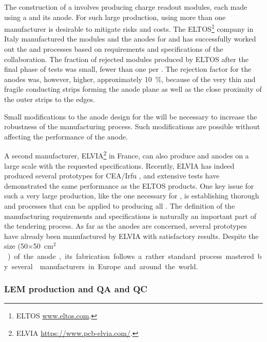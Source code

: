 The construction of a  
 involves producing \dpnumswch charge readout modules, each made using a  and its anode. For such large production, using more than one manufacturer is desirable to mitigate risks and costs. The ELTOS\footnote{ELTOS\texttrademark{} \url{www.eltos.com}.} company in Italy manufactured the  modules and the anodes for   and has successfully worked out the  and  processes based on requirements and specifications of the  collaboration. The fraction of rejected  modules produced by ELTOS after the final phase of tests was small, fewer than one  per . The rejection factor for the anodes was, however, higher, approximately \SI{10}{\%}, because of the very thin and fragile conducting strips forming the anode plane as well as the close proximity of the outer strips to the  edges. 

Small modifications to the anode design for the  will be necessary to increase the robustness of the manufacturing process. Such modifications are possible without  
affecting the performance of the anode.   

A second manufacturer, ELVIA\footnote{ELVIA\texttrademark{} \url{https://www.pcb-elvia.com/}.} in France, can also produce  and anodes on a large scale with the requested specifications. Recently, ELVIA has indeed produced several  prototypes for CEA/Irfu 
, and extensive tests have 
demonstrated the same  performance as the ELTOS products.
 One key issue for such a very large production, like the one necessary for , is establishing thorough  and  processes that can be applied to producing all . The definition of the  manufacturing requirements and specifications is naturally an important part of the tendering process. As far as the anodes are concerned, several prototypes have already been manufactured by ELVIA with satisfactory results. Despite the size (\num{50}$\times$\SI{50}{cm$^2$}) of the anode, its fabrication follows a rather standard process mastered by several  manufacturers in Europe and around the world.     

\subsubsection{LEM production and QA and QC}
\label{sec:fddp-crp-LEMprod}

